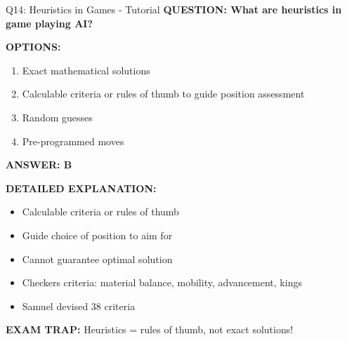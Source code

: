 \documentclass[8pt]{beamer}
\begin{document}
	\begin{frame}{Q14: Heuristics in Games - Tutorial}
		\fontsize{6.5}{7.5}\selectfont
		\textbf{QUESTION: What are heuristics in game playing AI?}
		
		\vspace{0.1cm}
		\textbf{OPTIONS:}
		\begin{enumerate}
			\item Exact mathematical solutions
			\item Calculable criteria or rules of thumb to guide position assessment
			\item Random guesses
			\item Pre-programmed moves
		\end{enumerate}
		
		\vspace{0.1cm}
		\textcolor{myblue}{\textbf{ANSWER: B}}
		
		\vspace{0.1cm}
		\textbf{DETAILED EXPLANATION:}
		\begin{itemize}
			\item Calculable criteria or rules of thumb
			\item Guide choice of position to aim for
			\item Cannot guarantee optimal solution
			\item Checkers criteria: material balance, mobility, advancement, kings
			\item Samuel devised 38 criteria
		\end{itemize}
		
		\vspace{0.1cm}
		\textcolor{myred}{\textbf{EXAM TRAP:}} Heuristics = \textcolor{myblue}{rules of thumb}, not exact solutions!
	\end{frame}
	
\end{document}
